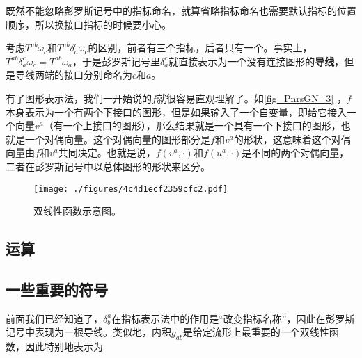 既然不能忽略彭罗斯记号中的指标命名，就算省略指标命名也需要默认指标的位置顺序，所以换接口指标的时候要小心。

考虑$T^{ab}\omega_{c}$和$T^{ab}\delta^c_a\omega_{c}$的区别，前者有三个指标，后者只有一个。事实上，$T^{ab}\delta^c_a\omega_{c} = T^{ab}\omega_{a}$，于是彭罗斯记号里$\delta^c_a$就直接表示为一个没有连接图形的\textbf{导线}，但是导线两端的接口分别命名为$c$和$a$。


有了图形表示法，我们一开始说的$f$就很容易直观理解了。如\autoref{fig_PnrsGN_3} ，$f$本身表示为一个有两个下接口的图形，但是如果输入了一个自变量，即给它接入一个向量$v^a$（有一个上接口的图形），那么结果就是一个具有一个下接口的图形，也就是一个对偶向量。这个对偶向量的图形部分是$f$和$v^a$的形状，这意味着这个对偶向量由$f$和$v^a$共同决定。也就是说，$f(v^a, \cdot)$和$f(u^a, \cdot)$是不同的两个对偶向量，二者在彭罗斯记号中以总体图形的形状来区分。

\begin{figure}[ht]
\centering
\texttt{[image: ./figures/4c4d1ecf2359cfc2.pdf]}
\caption{双线性函数示意图。} \label{fig_PnrsGN_3}
\end{figure}



\subsection{运算}










\subsection{一些重要的符号}


前面我们已经知道了，$\delta_b^a$在指标表示法中的作用是“改变指标名称”，因此在彭罗斯记号中表现为一根导线。类似地，内积$g_{ab}$是给定流形上最重要的一个双线性函数，因此特别地表示为




























